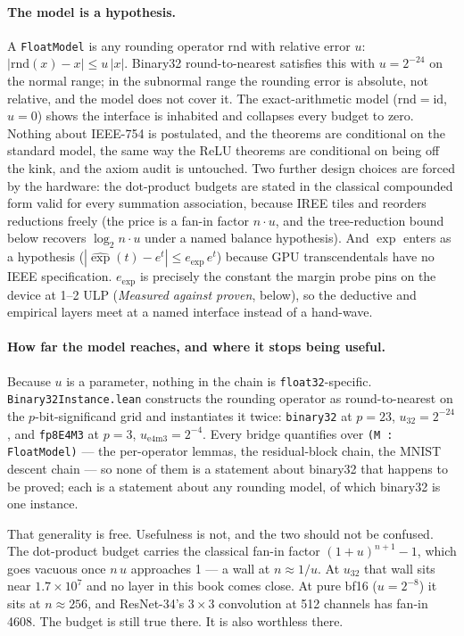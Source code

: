 \paragraph{The model is a hypothesis.}
A \texttt{FloatModel} is any rounding operator \(\mathrm{rnd}\)
with relative error \(u\): \(|\mathrm{rnd}(x) - x| \le u\,|x|\).
Binary32 round-to-nearest satisfies this with \(u = 2^{-24}\) on the
normal range; in the subnormal range the rounding error is absolute, not
relative, and the model does not cover it. The exact-arithmetic model
(\(\mathrm{rnd} = \mathrm{id}\), \(u = 0\)) shows the interface is
inhabited and collapses every budget to zero. Nothing about IEEE-754 is
postulated, and the theorems are conditional on the standard model, the
same way the ReLU theorems are conditional on being off the kink, and
the axiom audit is untouched. Two further design choices are forced by
the hardware: the dot-product budgets are stated in the classical
compounded form valid for every summation association, because
IREE tiles and reorders reductions freely (the price is a fan-in factor
\(n\cdot u\), and the tree-reduction bound below recovers
\(\log_2 n\cdot u\) under a named balance hypothesis). And \(\exp\) enters
as a hypothesis (\(|\widehat{\exp}(t) - e^t| \le e_{\exp}\, e^t\))
because GPU transcendentals have no IEEE specification.
\(e_{\exp}\) is precisely the constant the margin probe pins on the
device at 1--2 ULP (\emph{Measured against proven}, below), so the
deductive and empirical layers meet at a named interface instead of a
hand-wave.

\paragraph{How far the model reaches, and where it stops being useful.}
\label{par:precision_reach}
Because \(u\) is a parameter, nothing in the chain is
\texttt{float32}-specific. \texttt{Binary32Instance.lean} constructs the
rounding operator as round-to-nearest on the \(p\)-bit-significand grid
and instantiates it twice: \texttt{binary32} at \(p = 23\),
\(u_{32} = 2^{-24}\), and \texttt{fp8E4M3} at \(p = 3\),
\(u_{\mathrm{e4m3}} = 2^{-4}\). Every bridge quantifies over
\texttt{(M : FloatModel)} --- the per-operator lemmas, the residual-block
chain, the MNIST descent chain --- so none of them is a statement about
binary32 that happens to be proved; each is a statement about any
rounding model, of which binary32 is one instance.

\medskip\noindent That generality is free. Usefulness is not, and the two
should not be confused. The dot-product budget carries the classical
fan-in factor \((1+u)^{n+1} - 1\), which goes vacuous once \(n\,u\)
approaches 1 --- a wall at \(n \approx 1/u\). At \(u_{32}\) that wall sits
near \(1.7 \times 10^{7}\) and no layer in this book comes close. At pure
bf16 (\(u = 2^{-8}\)) it sits at \(n \approx 256\), and ResNet-34's
\(3\times3\) convolution at 512 channels has fan-in 4608. The budget is
still true there. It is also worthless there.

